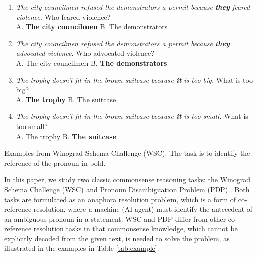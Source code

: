\documentclass[11pt,a4paper]{article}
\begin{document}
\begin{table}[!ht]
\begin{enumerate} 

\item \textit{The city councilmen refused the demonstrators a permit because \textbf{they} feared violence.} 
Who feared violence? \\
A. \textbf{The city councilmen}\hspace{0.02\textwidth} B. The demonstrators

\item \textit{The city councilmen refused the demonstrators a permit because \textbf{they} advocated violence.} 
Who advocated violence? \\
A. The city councilmen\hspace{0.02\textwidth} B. \textbf{The demonstrators}

\item \textit{The trophy doesn't fit in the brown suitcase because \textbf{it} is too big.}
What is too big? \\
A. \textbf{The trophy}\hspace{0.02\textwidth} B. The suitcase

\item \textit{The trophy doesn't fit in the brown suitcase because \textbf{it} is too small.}
What is too small? \\
A. The trophy\hspace{0.02\textwidth} B. \textbf{The suitcase}

\end{enumerate}
\caption{Examples from Winograd Schema Challenge (WSC). The task is to identify the reference of the pronoun in bold.}
\label{tab:example}
\end{table}

In this paper, we study two classic commonsense reasoning tasks: the Winograd Schema Challenge (WSC) and Pronoun Disambiguation Problem (PDP) \cite{levesque2011winograd,davis2015commonsense}. 
Both tasks are formulated as an anaphora resolution problem, which is a form of co-reference resolution, where a machine (AI agent) must identify the antecedent of an ambiguous pronoun in a statement. 
WSC and PDP differ from other co-reference resolution tasks \cite{soon2001machine,ng2002improving,peng2016event} in that commonsense knowledge, which cannot be explicitly decoded from the given text, is needed to solve the problem, as illustrated in the examples in Table \ref{tab:example}.
\end{document}

